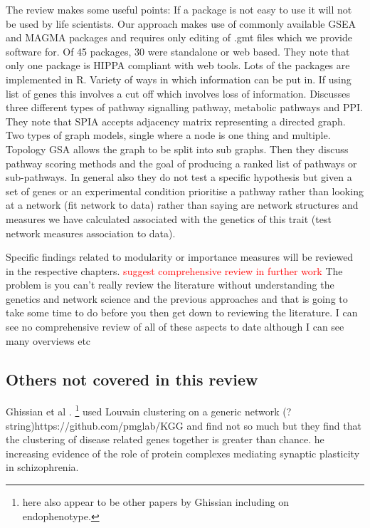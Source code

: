 The review makes some useful points: If a package is not easy to use it will not be used by life scientists. Our approach makes use of commonly available GSEA and MAGMA packages and requires only editing of .gmt files which we provide software for. Of 45 packages, 30 were standalone or web based. They note that only one package is HIPPA compliant with web tools. Lots of the packages are implemented in R. Variety of ways in which information can be put in. If using list of genes this involves a cut off which involves loss of information. Discusses three different types of pathway signalling pathway, metabolic pathways and PPI. They note that SPIA accepts adjacency matrix representing a directed graph. Two types of graph models, single where a node is one thing and multiple. Topology GSA allows the graph to be split into sub graphs.
Then they discuss pathway scoring methods and the goal of producing a ranked list of pathways or sub-pathways.
In general also they do not test a specific hypothesis but given a set of genes or an experimental condition prioritise a pathway rather than looking at a network (fit network to data) rather than saying are network structures and measures we have calculated associated with the genetics of this trait (test network measures association to data).





Specific findings related to modularity or importance measures will be reviewed in the respective chapters. 
\textcolor{red}{suggest comprehensive review in further work} The problem is you can't really review the literature without understanding the genetics and network science and the previous approaches and that is going to take some time to do before you then get down to reviewing the literature. I can see no comprehensive review of all of these aspects to date although I can see many overviews etc


\subsection{Others not covered in this review}
\label{sec:others not covered in this review}
Ghissian et al \cite{ghiassian2015disease}. \footnote{here also appear to be other papers by Ghissian including on endophenotype.} used Louvain clustering  on a generic network (? string)https://github.com/pmglab/KGG and find not \cite{blondel2008fast}so much but they find that the clustering of disease related genes together is greater than chance. he increasing evidence of the role of protein complexes mediating synaptic plasticity in schizophrenia.

